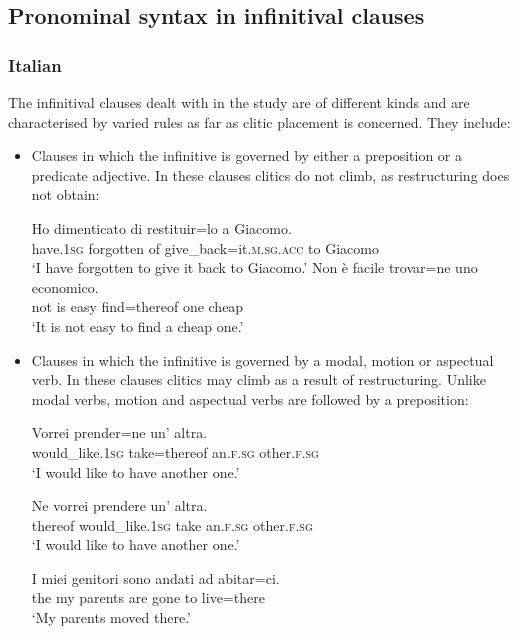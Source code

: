 \documentclass[output=paper,modfonts,nonflat,newtxmath]{langsci/langscibook}
\begin{document}
\subsection{Pronominal syntax in infinitival clauses} %
\label{sec:sciutti:2.2}

\subsubsection{Italian} %

The infinitival clauses dealt with in the study are of different kinds and are characterised by varied rules as far as clitic placement is concerned. They include:

\begin{itemize}
\item Clauses in which the infinitive is governed by either a preposition or a predicate adjective. In these clauses clitics do not climb, as restructuring does not obtain:

\ea \label{ex:sciutti:3}
    \gll Ho dimenticato di restituir=lo a Giacomo.\\
        have.\textsc{1sg} forgotten of give\_back=it.\textsc{m.sg.acc} to Giacomo\\
    \glt  ‘I have forgotten to give it back to Giacomo.’
\ex \label{ex:sciutti:4}
    \gll Non è facile trovar=ne uno economico.\\
         not is easy find=thereof one cheap\\
    \glt  ‘It is not easy to find a cheap one.’
\z

\item Clauses in which the infinitive is governed by a modal, motion or aspectual verb. In these clauses clitics may climb as a result of restructuring. Unlike modal verbs, motion and aspectual verbs are followed by a preposition:

\ea \label{ex:sciutti:5}
    \begin{xlist}
    \ex \label{ex:sciutti:5a}
    \gll Vorrei prender=ne un’ altra.\\
         would\_like.\textsc{1sg} take=thereof an.\textsc{f.sg} other.\textsc{f.sg}\\
    \glt  ‘I would like to have another one.’

    \ex \label{ex:sciutti:5b}
    \gll Ne vorrei prendere un’ altra.\\
         thereof would\_like.\textsc{1sg} take an.\textsc{f.sg} other.\textsc{f.sg}\\
    \glt  ‘I would like to have another one.’
    \end{xlist}
\ex \label{ex:sciutti:6}
    \begin{xlist}
    \ex \label{ex:sciutti:6a}
    \gll I miei genitori sono andati ad abitar=ci.\\
         the my parents are gone to live=there\\
    \glt  ‘My parents moved there.’


\end{xlist}
\end{itemize}
\end{document}
